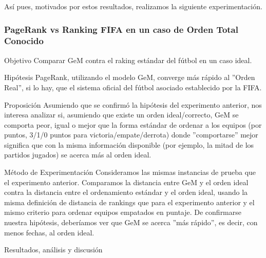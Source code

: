 \par As\'i pues, motivados por estos resultados, realizamos la siguiente
experimentaci\'on.

\subsubsection{PageRank vs Ranking FIFA en un caso de Orden Total Conocido}
\label{subsec:exp5_aux}
\begin{LaTeXdescription}
    \item[Objetivo] Comparar GeM contra el raking est\'andar del f\'utbol en un
        caso ideal.\\

    \item[Hip\'otesis] PageRank, utilizando el modelo GeM, converge m\'as
        r\'apido al ''Orden Real'', si lo hay, que el sistema oficial del
        f\'utbol asociado establecido por la FIFA\cite{fifa}.\\

    \item[Proposici\'on] Asumiendo que se confirm\'o la hip\'otesis del
        experimento anterior, nos interesa analizar si, asumiendo que existe un
        orden ideal/correcto, GeM se comporta peor, igual o mejor que la forma
        est\'andar de ordenar a los equipos (por puntos, 3/1/0 puntos para
        victoria/empate/derrota) donde ''comportarse'' mejor significa que con
        la misma información disponible (por ejemplo, la mitad de los partidos
        jugados) se acerca m\'as al orden ideal.\\

    \item[M\'etodo de Experimentaci\'on] Consideramos las mismas instancias de
        prueba que el experimento anterior. Comparamos la distancia entre GeM y
        el orden ideal contra la distancia entre el ordenamiento est\'andar y el
        orden ideal, usando la misma definici\'on de distancia de rankings que
        para el experimento anterior y el mismo criterio para ordenar equipos
        empatados en puntaje. De confirmarse nuestra hip\'otesis, deber\'iamos
        ver que GeM se acerca ''m\'as r\'apido'', es decir, con menos fechas, al
        orden ideal.\\

    \item[Resultados, an\'alisis y discusi\'on] 
\end{LaTeXdescription}


